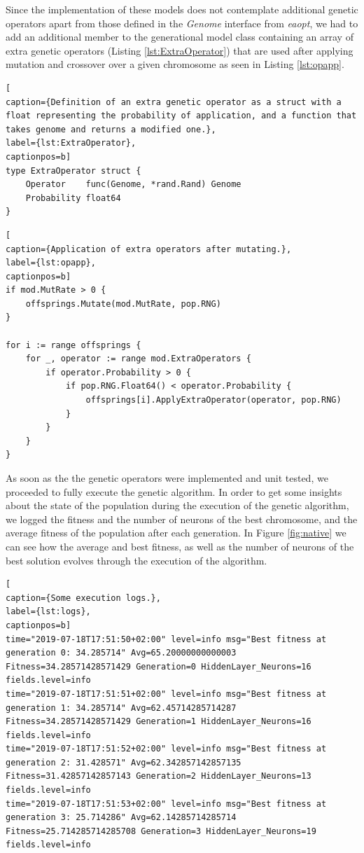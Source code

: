 Since the implementation of these models does not contemplate additional genetic operators apart from those defined in the \textit{Genome} interface from \textit{eaopt}, we had to add an additional member to the generational model class containing an array of extra genetic operators (Listing \ref{lst:ExtraOperator}) that are used after applying mutation and crossover over a given chromosome as seen in Listing \ref{lst:opapp}.

\begin{lstlisting}[
caption={Definition of an extra genetic operator as a struct with a float representing the probability of application, and a function that takes genome and returns a modified one.},
label={lst:ExtraOperator},
captionpos=b]
type ExtraOperator struct {
	Operator    func(Genome, *rand.Rand) Genome
	Probability float64
}
\end{lstlisting}

\begin{lstlisting}[
caption={Application of extra operators after mutating.},
label={lst:opapp},
captionpos=b]
if mod.MutRate > 0 {
	offsprings.Mutate(mod.MutRate, pop.RNG)
}

for i := range offsprings {
	for _, operator := range mod.ExtraOperators {
		if operator.Probability > 0 {
			if pop.RNG.Float64() < operator.Probability {
				offsprings[i].ApplyExtraOperator(operator, pop.RNG)
			}
		}
	}
}
\end{lstlisting} 

As soon as the the genetic operators were implemented and unit tested, we proceeded to fully execute the genetic algorithm.
In order to get some insights about the state of the population during the execution of the genetic algorithm, we logged the fitness and the number of neurons of the best chromosome, and the average fitness of the population after each generation. In Figure \ref{fig:native} we can see how the average and best fitness, as well as the number of neurons of the best solution evolves through the execution of the algorithm.

\begin{lstlisting}[
caption={Some execution logs.},
label={lst:logs},
captionpos=b]
time="2019-07-18T17:51:50+02:00" level=info msg="Best fitness at generation 0: 34.285714" Avg=65.20000000000003 Fitness=34.28571428571429 Generation=0 HiddenLayer_Neurons=16 fields.level=info
time="2019-07-18T17:51:51+02:00" level=info msg="Best fitness at generation 1: 34.285714" Avg=62.45714285714287 Fitness=34.28571428571429 Generation=1 HiddenLayer_Neurons=16 fields.level=info
time="2019-07-18T17:51:52+02:00" level=info msg="Best fitness at generation 2: 31.428571" Avg=62.342857142857135 Fitness=31.42857142857143 Generation=2 HiddenLayer_Neurons=13 fields.level=info
time="2019-07-18T17:51:53+02:00" level=info msg="Best fitness at generation 3: 25.714286" Avg=62.14285714285714 Fitness=25.714285714285708 Generation=3 HiddenLayer_Neurons=19 fields.level=info
\end{lstlisting} 

